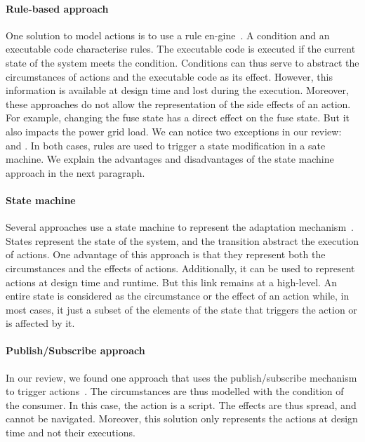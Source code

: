 \paragraph{Rule-based approach}
One solution to model \glspl{action} is to use a rule en-\linebreak gine~\cite{DBLP:conf/icse/TaharaOH17, DBLP:conf/icse/ArcainiRS15, DBLP:conf/wrla/BruniCGLV12, DBLP:conf/eurosys/GraceHPBCT08, DBLP:conf/gpce/PintoFT03, DBLP:journals/computer/GarlanCHSS04}.
A condition and an executable code characterise rules.
The executable code is executed if the current state of the system meets the condition.
Conditions can thus serve to abstract the \glspl{circumstance} of \glspl{action} and the executable code as its effect.
However, this information is available at design time and lost during the execution.
Moreover, these approaches do not allow the representation of the side effects of an action.
For example, changing the fuse state has a direct effect on the fuse state.
But it also impacts the power grid load.
We can notice two exceptions in our review: \cite{DBLP:conf/icse/TaharaOH17} and \cite{DBLP:conf/icse/ArcainiRS15}.
In both cases, rules are used to trigger a state modification in a sate machine.
We explain the advantages and disadvantages of the state machine approach in the next paragraph. 

\paragraph{State machine}
Several approaches use a state machine to represent the adaptation mechanism~\cite{DBLP:conf/icse/ArcainiRS15, DBLP:conf/icse/IftikharW14a, DBLP:conf/smartgridsec/0001FKNT14, DBLP:conf/sigsoft/MorenoCGS15, DBLP:conf/kbse/FilieriGLM11, DBLP:conf/wetice/DjoudiBZ14, DBLP:conf/aosd/ZhangGC09, DBLP:conf/icse/GhezziPST13, DBLP:conf/kbse/TajalliGEM10}.
States represent the state of the system, and the transition abstract the execution of \glspl{action}. 
One advantage of this approach is that they represent both the \glspl{circumstance} and the effects of actions.
Additionally, it can be used to represent actions at design time and runtime.
But this link remains at a high-level.
An entire state is considered as the circumstance or the effect of an action while, in most cases, it just a subset of the elements of the state that triggers the action or is affected by it. 

\paragraph{Publish/Subscribe approach}
In our review, we found one approach that uses the publish/subscribe mechanism to trigger \glspl{action}~\cite{DBLP:conf/icse/BarbosaLMJ17}.
The \glspl{circumstance} are thus modelled with the condition of the consumer.
In this case, the \gls{action} is a script.
The effects are thus spread, and cannot be navigated.
Moreover, this solution only represents the actions at design time and not their executions.
	
